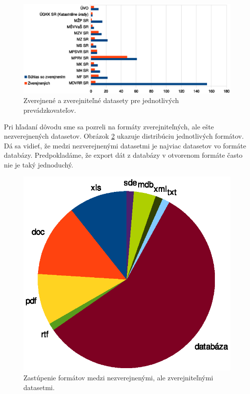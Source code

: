 \documentclass[12pt,a4paper]{article}
\begin{document}
\begin{figure}
\center \includegraphics[width=14cm]{zverejnene_prevadzkovatel}
\caption{Zverejnené a zverejniteľné datasety pre jednotlivých prevádzkovateľov.}
\label{zverejnene}
\end{figure}

Pri hľadaní dôvodu sme sa pozreli na formáty zverejniteľných, ale ešte nezverejnených datasetov. Obrázok \ref{nezverejnene_formaty} ukazuje distribúciu jednotlivých formátov. Dá sa vidieť, že medzi nezverejnenými datasetmi je najviac datasetov vo formáte databázy. Predpokladáme, že export dát z databázy v otvorenom formáte často nie je taký jednoduchý.

\begin{figure}
\center \includegraphics[width=14cm]{nezverejnene_formaty}
\caption{Zastúpenie formátov medzi nezverejnenými, ale zverejniteľnými datasetmi.}
\label{nezverejnene_formaty}
\end{figure}
\end{document}
